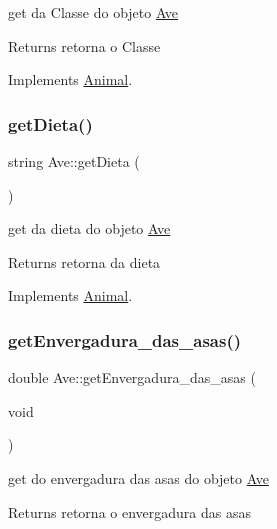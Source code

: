 get da Classe do objeto \mbox{\hyperlink{class_ave}{Ave}} 

\begin{DoxyReturn}{Returns}
retorna o Classe 
\end{DoxyReturn}


Implements \mbox{\hyperlink{class_animal}{Animal}}.

\mbox{\label{class_ave_aabab5e42561bc10a1c172106f6488d2a}} 
\subsubsection{\texorpdfstring{getDieta()}{getDieta()}}
{\footnotesize\ttfamily string Ave\+::get\+Dieta (\begin{DoxyParamCaption}{ }\end{DoxyParamCaption})\hspace{0.3cm}{\ttfamily [virtual]}}



get da dieta do objeto \mbox{\hyperlink{class_ave}{Ave}} 

\begin{DoxyReturn}{Returns}
retorna da dieta 
\end{DoxyReturn}


Implements \mbox{\hyperlink{class_animal}{Animal}}.

\mbox{\label{class_ave_a2ea10c8cd10a04cc3daa64ea388ce05b}} 
\subsubsection{\texorpdfstring{getEnvergadura\_das\_asas()}{getEnvergadura\_das\_asas()}}
{\footnotesize\ttfamily double Ave\+::get\+Envergadura\+\_\+das\+\_\+asas (\begin{DoxyParamCaption}\item[{void}]{ }\end{DoxyParamCaption})}



get do envergadura das asas do objeto \mbox{\hyperlink{class_ave}{Ave}} 

\begin{DoxyReturn}{Returns}
retorna o envergadura das asas 
\end{DoxyReturn}
\mbox{\label{class_ave_a3d331599c69fe88dfebb48f28c486570}} 
